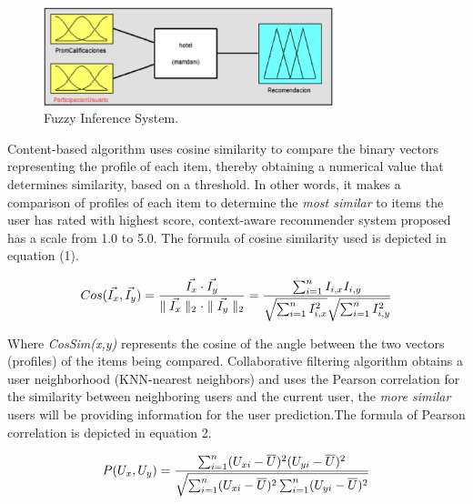 \begin{figure}
\captionsetup{justification=centering,margin=2cm}
\centering

\setlength\fboxsep{0pt}
\setlength\fboxrule{0.7pt}
\includegraphics[width=0.75\textwidth]{img/fis.png}
\caption{Fuzzy Inference System.}
\label{fig:fis}       %
\end{figure}

Content-based algorithm uses cosine similarity to compare the binary vectors
representing the profile of each item, thereby obtaining a numerical value that
determines similarity, based on a threshold. In other words, it makes a
comparison of profiles of each item to determine the \textit{most similar} to
items the user has rated with highest score, context-aware recommender system
proposed has a scale from 1.0 to 5.0. The formula of cosine similarity used is
depicted in equation (1).

\begin{equation}
\displaystyle %
 Cos (\vec{I_{x}}, \vec{I_{y}}) ={\vec{I_{x}} \cdot  \vec{I_{y}} \over \parallel \vec{I_{x}} \parallel_{2} \cdot \parallel \vec{I_{y}} \parallel_{2}} = {\sum_{i=1}^{n} I_{i,x} I_{i,y} \over \sqrt{\sum_{i=1}^{n} I_{i,x}^{2}} \sqrt{\sum_{i=1}^{n} I_{i,y}^{2}}} 
\end{equation}

Where \textit{CosSim(x,y)} represents the cosine of the angle between the two vectors
(profiles) of the items being compared. Collaborative filtering algorithm
obtains a user neighborhood (KNN-nearest neighbors) and uses the Pearson
correlation for the similarity between neighboring users and the current user,
the \textit{more similar} users will be providing information for the user prediction.The formula of Pearson correlation \cite{ricci2011introduction} is depicted in equation 2.

\begin{equation}
\displaystyle
P(U_{x}, U_{y}) = {\sum_{i=1}^{n}(U_{xi} - \overline{U})^2 (U_{yi}- \overline{U})^2 \over \sqrt{\sum_{i=1}^{n}(U_{xi}- \overline{U})^2 \sum_{i=1}^{n}(U_{yi}- \overline{U})^2}}
\end{equation}
\\

